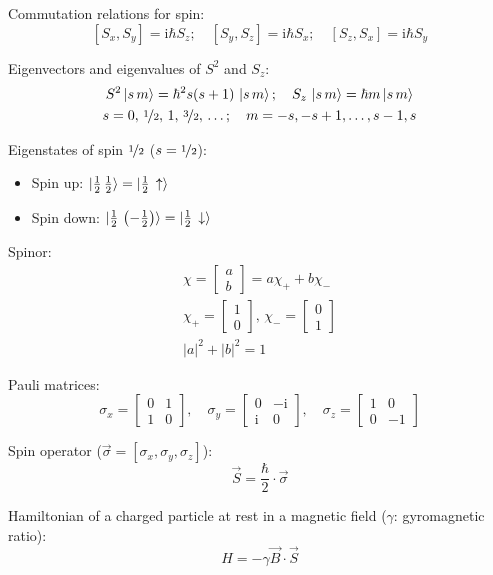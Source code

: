 \documentclass[fontsize=11pt,a4paper]{scrartcl}
\begin{document}
Commutation relations for spin:
\[
	[S_x,S_y]=\mathrm{i}\hbar S_z;
		\quad[S_y,S_z]=\mathrm{i}\hbar S_x;
		\quad[S_z,S_x]=\mathrm{i}\hbar S_y
\]

Eigenvectors and eigenvalues of $S^2$ and $S_z$:
\begin{gather*}
	S^2\ket{s\,m}=\hbar^2s(s+1)\,\ket{s\,m};
		\quad S_z\,\ket{s\,m}=\hbar m\ket{s\,m}\\
	s=0,\,\nicefrac{1}{2},\,1,\,\nicefrac{3}{2},\,\dots;
		\quad m=-s,-s+1,\dots,s-1,s
\end{gather*}

Eigenstates of spin $\nicefrac{1}{2}$ ($s=\nicefrac{1}{2}$):
\begin{itemize}
	\item Spin up: $\ket{\frac{1}{2}\,\frac{1}{2}} = \ket{\frac{1}{2}\,\uparrow}$
	\item Spin down: $\ket{\frac{1}{2}\,\left(-\frac{1}{2}\right)} = \ket{\frac{1}{2}\,\downarrow}$
\end{itemize}

Spinor:
\begin{gather*}
	\chi=\begin{bmatrix}a\\b\end{bmatrix}=a\chi_+ + b\chi_-\\
	\chi_+=\begin{bmatrix}1\\0\end{bmatrix},\,
	\chi_-=\begin{bmatrix}0\\1\end{bmatrix}\\
	|a|^2+|b|^2=1
\end{gather*}

Pauli matrices:
\[
	\sigma_x=\begin{bmatrix}0 & 1\\ 1 & 0\end{bmatrix},
	\quad\sigma_y=\begin{bmatrix}0 & -\mathrm{i}\\ \mathrm{i} & 0\end{bmatrix},
	\quad\sigma_z=\begin{bmatrix}1 & 0\\ 0 & -1\end{bmatrix}
\]

Spin operator ($\vec\sigma=[\sigma_x,\sigma_y,\sigma_z]$):
\[
	\vec S = \frac{\hbar}{2}\cdot\vec\sigma
\]

Hamiltonian of a charged particle at rest in a magnetic field ($\gamma$: gyromagnetic ratio):
\[
	H=-\gamma\vec B\cdot\vec S
\]
\end{document}
